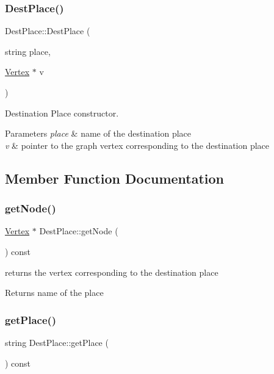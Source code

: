 \subsubsection{\texorpdfstring{Dest\+Place()}{DestPlace()}}
{\footnotesize\ttfamily Dest\+Place\+::\+Dest\+Place (\begin{DoxyParamCaption}\item[{string}]{place,  }\item[{\hyperlink{class_vertex}{Vertex} $\ast$}]{v }\end{DoxyParamCaption})}



Destination Place constructor. 


\begin{DoxyParams}{Parameters}
{\em place} & name of the destination place\\
\hline
{\em v} & pointer to the graph vertex corresponding to the destination place \\
\hline
\end{DoxyParams}


\subsection{Member Function Documentation}
\hypertarget{class_dest_place_ae66b6fb430724567fa11d8cdd9072502}{}\label{class_dest_place_ae66b6fb430724567fa11d8cdd9072502} 
\subsubsection{\texorpdfstring{get\+Node()}{getNode()}}
{\footnotesize\ttfamily \hyperlink{class_vertex}{Vertex} $\ast$ Dest\+Place\+::get\+Node (\begin{DoxyParamCaption}{ }\end{DoxyParamCaption}) const}



returns the vertex corresponding to the destination place 

\begin{DoxyReturn}{Returns}
name of the place 
\end{DoxyReturn}
\hypertarget{class_dest_place_a12ddb542096ab0aca2fe5f0ac3d3e4e7}{}\label{class_dest_place_a12ddb542096ab0aca2fe5f0ac3d3e4e7} 
\subsubsection{\texorpdfstring{get\+Place()}{getPlace()}}
{\footnotesize\ttfamily string Dest\+Place\+::get\+Place (\begin{DoxyParamCaption}{ }\end{DoxyParamCaption}) const}



